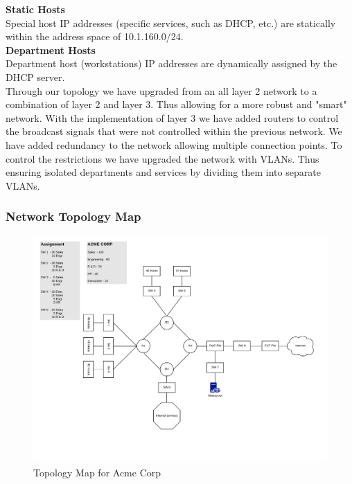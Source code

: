 \noindent
\textbf{Static Hosts} \\
Special host IP addresses (specific services, such as DHCP, etc.) are 
statically within the address space of 10.1.160.0/24. \\

\noindent
\textbf{Department Hosts} \\
Department host (workstations) IP addresses are dynamically assigned by the DHCP
server. \\

Through our topology we have upgraded from an all layer 2 network to a 
combination of layer 2 and layer 3. Thus allowing for a more robust and "smart" 
network. With the implementation of layer 3 we have added routers to control 
the broadcast signals that were not controlled within the previous network. We 
have added redundancy to the network allowing multiple connection points. To 
control the restrictions we have upgraded the network with VLANs. Thus ensuring 
isolated departments and services by dividing them into separate VLANs. 
 
\subsubsection{Network Topology Map}
\begin{figure}[!htb]
	\includegraphics[width=\textwidth]{images/networktopology.png}
	\caption{Topology Map for Acme Corp}
\end{figure}
